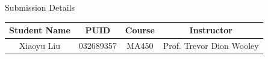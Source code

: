 
\begin{table}[H]
	\centering
	Submission Details
	
	\begin{tabular}{|c|c|c|c|}
		\hline
		Student Name & PUID & Course & Instructor\\
		\hline
		Xiaoyu Liu & 032689357 & MA450 & Prof. Trevor Dion Wooley \\
		\hline
	\end{tabular}
\end{table}
